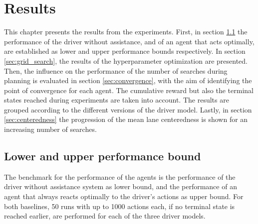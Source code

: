 \chapter{Results}
\label{ch:results}

This chapter presents the results from the experiments. First, in section \ref{sec:perf_bounds} the performance of the driver without assistance, and of an agent that acts optimally, are established as lower and upper performance bounds respectively. In section \ref{sec:grid_search}, the results of the hyperparameter optimization are presented. Then, the influence on the performance of the number of searches during planning is evaluated in section \ref{sec:convergence}, with the aim of identifying the point of convergence for each agent. The cumulative reward but also the terminal states reached during experiments are taken into account. The results are grouped according to the different versions of the driver model. Lastly, in section \ref{sec:centeredness} the progression of the mean lane centeredness is shown for an increasing number of searches.




\section{Lower and upper performance bound}
\label{sec:perf_bounds}


The benchmark for the performance of the agents is the performance of the driver without assistance system as lower bound, and the performance of an agent that always reacts optimally to the driver's actions as upper bound. For both baselines, 50 runs with up to 1000 actions each, if no terminal state is reached earlier, are performed for each of the three driver models. 

